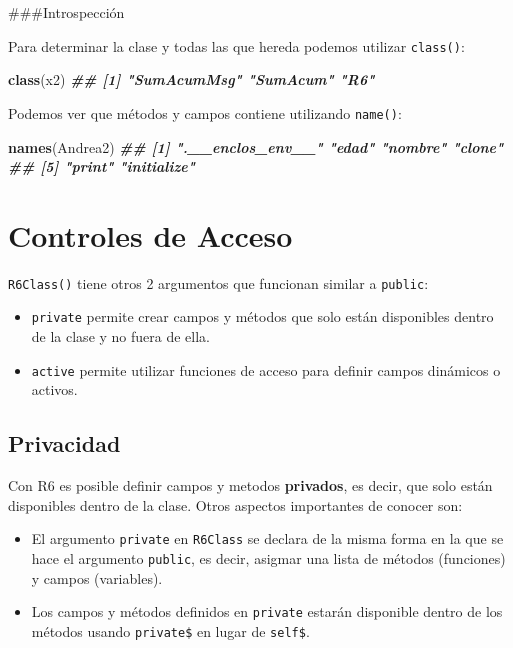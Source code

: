 \documentclass[
]{book}
\newenvironment{Shaded}{\begin{snugshade}}{\end{snugshade}}
\newcommand{\DocumentationTok}[1]{\textcolor[rgb]{0.56,0.35,0.01}{\textbf{\textit{#1}}}}
\newcommand{\FunctionTok}[1]{\textcolor[rgb]{0.13,0.29,0.53}{\textbf{#1}}}
\newcommand{\NormalTok}[1]{#1}
\begin{document}
\#\#\#Introspección

Para determinar la clase y todas las que hereda podemos utilizar \texttt{class()}:

\begin{Shaded}
\begin{Highlighting}[]
\FunctionTok{class}\NormalTok{(x2)}
\DocumentationTok{\#\# [1] "SumAcumMsg" "SumAcum"    "R6"}
\end{Highlighting}
\end{Shaded}

Podemos ver que métodos y campos contiene utilizando \texttt{name()}:

\begin{Shaded}
\begin{Highlighting}[]
\FunctionTok{names}\NormalTok{(Andrea2)}
\DocumentationTok{\#\# [1] ".\_\_enclos\_env\_\_" "edad"            "nombre"          "clone"          }
\DocumentationTok{\#\# [5] "print"           "initialize"}
\end{Highlighting}
\end{Shaded}

\hypertarget{controles-de-acceso}{%
\section{Controles de Acceso}\label{controles-de-acceso}}

\texttt{R6Class()} tiene otros 2 argumentos que funcionan similar a \texttt{public}:

\begin{itemize}
\item
  \texttt{private} permite crear campos y métodos que solo están disponibles dentro de la clase y no fuera de ella.
\item
  \texttt{active} permite utilizar funciones de acceso para definir campos dinámicos o activos.
\end{itemize}

\hypertarget{privacidad}{%
\subsection{Privacidad}\label{privacidad}}

Con R6 es posible definir campos y metodos \textbf{privados}, es decir, que solo están disponibles dentro de la clase. Otros aspectos importantes de conocer son:

\begin{itemize}
\item
  El argumento \texttt{private} en \texttt{R6Class} se declara de la misma forma en la que se hace el argumento \texttt{public}, es decir, asigmar una lista de métodos (funciones) y campos (variables).
\item
  Los campos y métodos definidos en \texttt{private} estarán disponible dentro de los métodos usando \texttt{private\$} en lugar de \texttt{self\$}.
\end{itemize}
\end{document}
